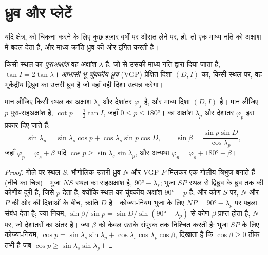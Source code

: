 \section{ध्रुव और प्लेटें}

यदि क्षेत्र,  को चिकना करने के लिए कुछ हज़ार वर्षों पर औसत लेने पर,
 हो, तो  एक माध्य नति को
अक्षांश में बदल देता है, और माध्य क्रांति ध्रुव की ओर इंगित करती है।

\begin{definition}[पुराअक्षांश; आभासी भू-चुंबकीय ध्रुव]\label{def:b3:palaeomagnetism:vgp}
किसी स्थल का \emph{पुराअक्षांश} वह अक्षांश
$\lambda$ है, जो  से उसकी माध्य नति द्वारा दिया जाता है, $\tan I =
2\tan\lambda$। \emph{आभासी भू-चुंबकीय ध्रुव}
(VGP) प्रेक्षित दिशा $(D, I)$ का, किसी स्थल पर, वह भूकेंद्रीय द्विध्रुव का
उत्तरी ध्रुव है जो वहाँ वही दिशा उत्पन्न करेगा।
\end{definition}

\begin{theorem}[किसी दिशा का ध्रुव]\label{thm:b3:palaeomagnetism:pole}
मान लीजिए किसी स्थल का अक्षांश $\lambda_s$ और देशांतर $\varphi_s$ है, और माध्य
दिशा $(D, I)$ है। मान लीजिए $p$ पुरा-सहअक्षांश है, $\cot p = \tfrac12\tan I$,
जहाँ $0 \le p \le \ang{180}$।  का अक्षांश
$\lambda_p$ और देशांतर $\varphi_p$ इस प्रकार दिए जाते हैं:
\[
  \sin\lambda_p = \sin\lambda_s\cos p + \cos\lambda_s\sin p\cos D,\qquad
  \sin\beta = \frac{\sin p\sin D}{\cos\lambda_p},
\]
जहाँ $\varphi_p = \varphi_s + \beta$ यदि $\cos p \ge \sin\lambda_s\sin\lambda_p$,
और अन्यथा $\varphi_p = \varphi_s + \ang{180} - \beta$।
\end{theorem}

\begin{proof}
गोले पर स्थल $S$, भौगोलिक उत्तरी ध्रुव $N$ और VGP $P$ मिलकर एक
गोलीय त्रिभुज बनाते हैं (नीचे का चित्र)। भुजा $NS$ स्थल का सहअक्षांश है,
$\ang{90} - \lambda_s$; भुजा $SP$ स्थल से द्विध्रुव के ध्रुव तक की कोणीय दूरी है,
जिसे  $p$ देता है, क्योंकि स्थल का चुंबकीय अक्षांश
$\ang{90} - p$ है; और कोण $S$ पर, $N$ और $P$ की ओर की दिशाओं के बीच,
क्रांति $D$ है। कोज्या-नियम भुजा के लिए
$NP = \ang{90} - \lambda_p$ पर पहला संबंध देता है; ज्या-नियम,
$\sin\beta/\sin p = \sin D/\sin(\ang{90} - \lambda_p)$ से कोण $\beta$ प्राप्त होता है,
$N$ पर, जो देशांतरों का अंतर है। ज्या $\beta$ को केवल उसके
संपूरक तक निश्चित करती है: भुजा $SP$ के लिए कोज्या-नियम, $\cos p = \sin\lambda_s
\sin\lambda_p + \cos\lambda_s\cos\lambda_p\cos\beta$, दिखाता है कि $\cos\beta \ge
0$ ठीक तभी है जब $\cos p \ge \sin\lambda_s\sin\lambda_p$।
\end{proof}

